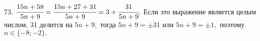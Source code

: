73. $\cfrac{15n+58}{5n+9}=\cfrac{15n+27+31}{5n+9}=3+\cfrac{31}{5n+9}.$ Если это выражение является целым числом, 31 делится на $5n+9,$ тогда $5n+9=\pm31$ или $5n+9=\pm1,$ поэтому $n\in\{-8;-2\}.$\\
